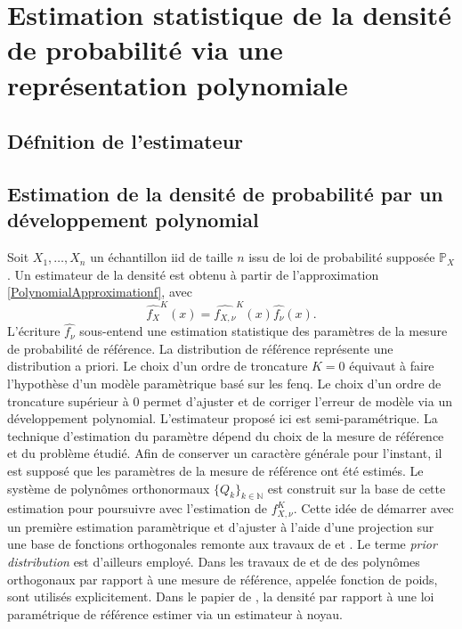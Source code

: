 
\chapter{Estimation statistique de la densité de probabilité via une représentation polynomiale}\label{Chapter3}
	\minitoc
	\newpage




\section{Défnition de l\rq{}estimateur}
\section{Estimation de la densité de probabilité par un développement polynomial}\label{Chapter2Section3}
Soit $X_{1},\ldots,X_{n}$ un échantillon \gls{iid} de taille $n$ issu de loi de probabilité supposée $\mathbb{P}_{X}$. Un estimateur de la densité est obtenu à partir de l'approximation \eqref{PolynomialApproximationf}, avec 
\begin{equation*}
\widehat{f_{X}}^{K}(x)=\widehat{f_{X,\nu}}^{K}(x)\widehat{f_{\nu}}(x).
\end{equation*}
L'écriture $\widehat{f_{\nu}}$ sous-entend une estimation statistique des paramètres de la mesure de probabilité de référence. La distribution de référence représente une distribution a priori. Le choix d'un ordre de troncature $K=0$ équivaut à faire l'hypothèse d'un modèle paramètrique basé sur les \gls{fenq}. Le choix d'un ordre de troncature supérieur à $0$ permet d'ajuster et de corriger l'erreur de modèle via un développement polynomial. L'estimateur proposé ici est semi-paramétrique. La technique d'estimation du paramètre dépend du choix de la mesure de référence et du problème étudié. Afin de conserver un caractère générale pour l'instant, il est supposé que les paramètres de la mesure de référence ont été estimés. Le système de polynômes orthonormaux $\{Q_{k}\}_{k\in\mathbb{N}}$ est construit sur la base de cette estimation pour poursuivre avec l'estimation de $f_{X,\nu}^{K}$. Cette idée de démarrer avec un première estimation paramètrique et d\rq{}ajuster à l\rq{}aide d'une projection sur une base de fonctions orthogonales remonte aux travaux de \citet{Wh58} et \citet{Br78}. Le terme \textit{prior distribution} est d\rq{}ailleurs employé. Dans les travaux de \citet{Bu92} et de \citet{PrJi12} des polynômes orthogonaux par rapport à une mesure de référence, appelée fonction de poids, sont utilisés explicitement. Dans le papier de \citet{HjGl95}, la densité par rapport à une loi paramétrique de référence estimer via un estimateur à noyau.

